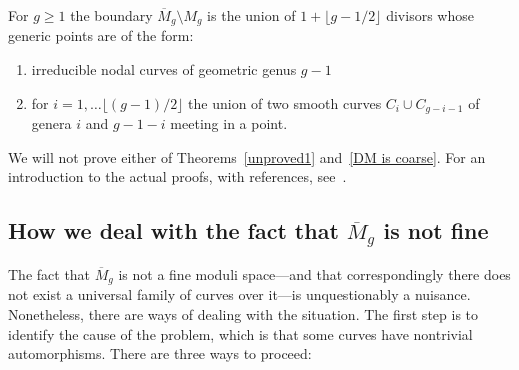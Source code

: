 \begin{fact}
\begin{proposition}
For $g\geq 1$ the boundary $\overline M_{g}\setminus M_{g}$ is the union of $1+\lfloor{g-1/2}\rfloor$ divisors whose generic points are of the form:
\begin{enumerate}
 \item irreducible nodal curves of geometric genus $g-1$
 \item for $i = 1, \dots \lfloor{(g-1)/2}\rfloor$ the union of two smooth curves $C_{i}\cup C_{g-i-1}$ of genera
 $i$ and $g-1-i$ meeting in a point.
\end{enumerate}
\end{proposition}
\end{fact}

We will not prove either of Theorems~\ref{unproved1} and~\ref{DM is coarse}. For an introduction to the actual proofs, with references, see~\cite{MR1631825}.

\subsection{How we deal with the fact that $\overline M_g$ is not fine}

The fact that $\overline M_g$ is not a fine moduli space---and that correspondingly there does not exist a universal family of curves over it---is unquestionably a nuisance. Nonetheless, there are ways of dealing with the situation. The first step is to identify the cause of the problem, which is that some curves have nontrivial automorphisms. There are three ways to proceed:

